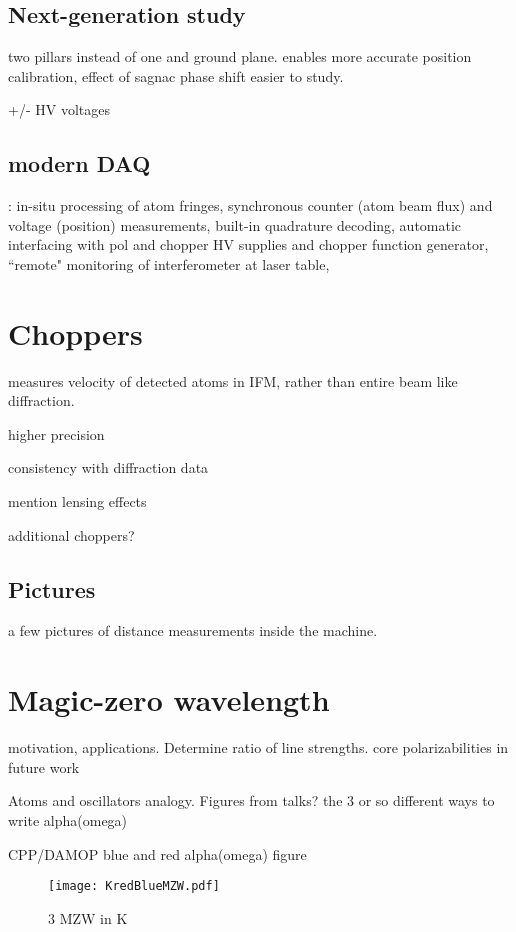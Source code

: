 \subsection{Next-generation study}

two pillars instead of one and ground plane. enables more accurate position calibration, effect of sagnac phase shift easier to study.

+/- HV voltages

\subsection{modern DAQ}: in-situ processing of atom fringes, synchronous counter (atom beam flux) and voltage (position) measurements, built-in quadrature decoding, automatic interfacing with pol and chopper HV supplies and chopper function generator,  ``remote" monitoring of interferometer at laser table, 




\section{Choppers}

measures velocity of detected atoms in IFM, rather than entire beam like diffraction.

higher precision

consistency with diffraction data

mention lensing effects

additional choppers?

\subsection{Pictures}

a few pictures of distance measurements inside the machine.





\section{Magic-zero wavelength}

motivation, applications. Determine ratio of line strengths. core polarizabilities in future work

Atoms and oscillators analogy. Figures from talks? the 3 or so different ways to write alpha(omega)

CPP/DAMOP blue and red alpha(omega) figure
\begin{figure}
\texttt{[image: KredBlueMZW.pdf]}
\caption{\label{KredBlueMZWfig}3 MZW in K}
\end{figure}

